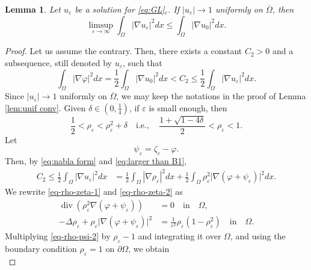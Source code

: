 \documentclass[a4paper,10pt,reqno]{amsart}
\newtheorem{lemma}[theorem]{Lemma}
\theoremstyle{definition}
\newcommand{\ve}{{\varepsilon}}
\newcommand{\vp}{{\varphi}}
\newcommand{\Om}{{\Omega}}
\newcommand{\qie}{{\quad \mbox{i.e.}, \quad}}
\newcommand{\qin}{{\quad \mbox{in} \quad}}
\numberwithin{equation}{section}
\begin{document}
\smallskip
\begin{lemma}\label{lem:limsup}
Let  $u_\ve$ be a solution for  \eqref{eq:GL}$_\ve$.
If $|u_\ve| \to 1 $ uniformly on $\overline\Om $, then
\begin{equation}\label{eq:limsup}
 \limsup_{\ve \to \infty} \int_\Om |\nabla u_\ve|^2  dx \le  \int_\Om |\nabla u_0|^2  dx.
\end{equation}
\end{lemma}
%
\begin{proof}
Let us assume the contrary.
Then,  there exists a constant $C_2>0$ and a subsequence, still denoted by $u_\ve$, such that
\begin{equation}\label{eq:larger than B1}
\int_\Omega |\nabla \vp|^2 dx=\frac12 \int_\Om |\nabla u_0|^2 dx< C_2 \le  \frac12 \int_\Om |\nabla u_\ve|^2 dx.
\end{equation}
 Since  $|u_\varepsilon| \to 1$ uniformly on $\overline\Omega$, we may keep the notations in the proof of Lemma \ref{lem:unif conv}.
Given   $\delta \in (0,\frac14)$, if $\ve$ is small enough, then
\begin{equation}\label{eq:delta chosen}
\frac{1}{2} < \rho_\ve <\rho_\ve^2 +\delta  \qie \frac{1+\sqrt{1-4\delta} }{2} <\rho_\ve <1.
\end{equation}
Let
\[ \psi_\varepsilon = \zeta_\varepsilon - \varphi.
\]
Then, by \eqref{eq:nabla form} and \eqref{eq:larger than B1},
\begin{equation}\label{eq:nabla u formula}
\begin{aligned}
C_2 \le  \frac{1}{2} \int_\Omega |\nabla u_\varepsilon|^2  dx
&=    \frac{1}{2} \int_\Omega |\nabla \rho_\varepsilon|^2  dx
+\frac{1}{2} \int_\Omega \rho_\varepsilon^2 \big|\nabla (\vp +\psi_\ve) \big|^2 dx.
\end{aligned}
\end{equation}
We rewrite \eqref{eq-rho-zeta-1} and \eqref{eq-rho-zeta-2} as 
\begin{align}\label{eq-rho-psi-1}
\operatorname{div}\left( \rho_\varepsilon^2 \nabla( \varphi + \psi_\varepsilon ) \right) &= 0 \qin \Omega, \\
\label{eq-rho-psi-2}
-\Delta \rho_\ve + \rho_\ve\big| \nabla (\varphi + \psi_\varepsilon )\big|^2 & = \frac{1}{\ve^2}\rho_\ve(1- \rho_\ve^2) \qin \Om.
\end{align}
Multiplying \eqref{eq-rho-psi-2} by $ \rho_\varepsilon - 1 $  and  integrating it over $ \Omega $, and using the boundary
condition $ \rho_\varepsilon  =1 $ on $\partial\Omega$, we obtain
\begin{equation}\label{eq-rho-psi-2-1}

\end{equation}
\end{proof}
\end{document}
